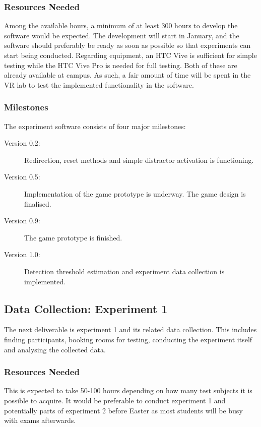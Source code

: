 \subsubsection{Resources Needed}
Among the available hours, a minimum of at least 300 hours to develop the software would be expected. The development will start in January, and the software should preferably be ready as soon as possible so that experiments can start being conducted. Regarding equipment, an HTC Vive is sufficient for simple testing while the HTC Vive Pro is needed for full testing. Both of these are already available at campus. As such, a fair amount of time will be spent in the VR lab to test the implemented functionality in the software. 

\subsubsection{Milestones}
The experiment software consists of four major milestones: 

\begin{description}
\item[Version 0.2: ] Redirection, reset methods and simple distractor activation is functioning.
\item[Version 0.5: ] Implementation of the game prototype is underway. The game design is finalised.
\item[Version 0.9: ] The game prototype is finished.
\item[Version 1.0: ] Detection threshold estimation and experiment data collection is implemented. 
\end{description}

\subsection{Data Collection: Experiment 1}
The next deliverable is experiment 1 and its related data collection. This includes finding participants, booking rooms for testing, conducting the experiment itself and analysing the collected data. 

\subsubsection{Resources Needed}
This is expected to take 50-100 hours depending on how many test subjects it is possible to acquire. It would be preferable to conduct experiment 1 and potentially parts of experiment 2 before Easter as most students will be busy with exams afterwards. 

